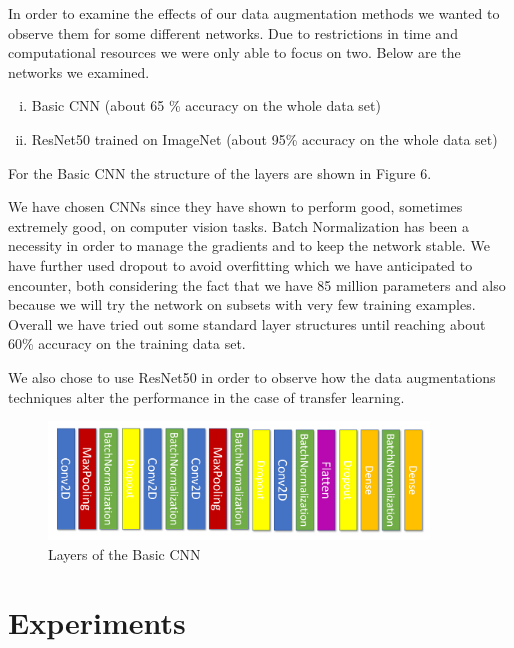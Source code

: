 \documentclass{article}
\begin{document}
In order to examine the effects of our data augmentation methods we wanted to observe them for some different networks. Due to restrictions in time and computational resources we were only able to focus on two. Below are the networks we examined.

\begin{enumerate}[(i)]
 \item Basic CNN (about 65 \% accuracy on the whole data set)
 \item ResNet50 trained on ImageNet (about 95\% accuracy on the whole data set)
\end{enumerate}

For the Basic CNN the structure of the layers are shown in Figure 6.

We have chosen CNNs since they have shown to perform good, sometimes extremely good, on computer vision tasks. Batch Normalization has been a necessity in order to manage the gradients and to keep the network stable. We have further used dropout to avoid overfitting which we have anticipated to encounter, both considering the fact that we have 85 million parameters and also because we will try the network on subsets with very few training examples. Overall we have tried out some standard layer structures until reaching about 60\% accuracy on the training data set.

We also chose to use ResNet50 in order to observe how the data augmentations techniques alter the performance in the case of transfer learning.

\begin{figure}[H]
	\centering
	\includegraphics[width=0.9\textwidth]{conv.PNG}
	\caption{Layers of the Basic CNN}
\end{figure}

\section{Experiments}

% 
\end{document}
